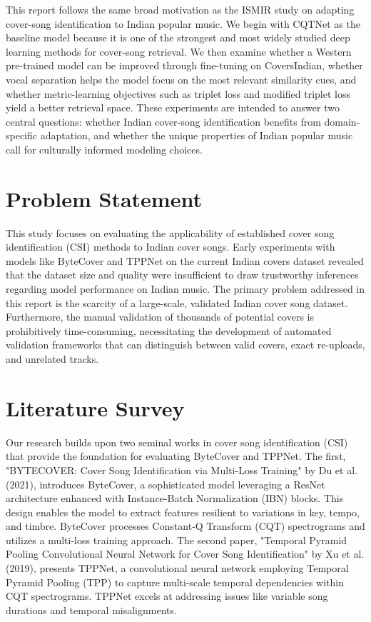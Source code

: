 \documentclass[conference]{IEEEtran}
\begin{document}
This report follows the same broad motivation as the ISMIR study on adapting cover-song identification to Indian popular music. We begin with CQTNet as the baseline model because it is one of the strongest and most widely studied deep learning methods for cover-song retrieval. We then examine whether a Western pre-trained model can be improved through fine-tuning on CoversIndian, whether vocal separation helps the model focus on the most relevant similarity cues, and whether metric-learning objectives such as triplet loss and modified triplet loss yield a better retrieval space. These experiments are intended to answer two central questions: whether Indian cover-song identification benefits from domain-specific adaptation, and whether the unique properties of Indian popular music call for culturally informed modeling choices.

\section{Problem Statement}
This study focuses on evaluating the applicability of established cover song identification (CSI) methods to Indian cover songs. Early experiments with models like ByteCover and TPPNet on the current Indian covers dataset revealed that the dataset size and quality were insufficient to draw trustworthy inferences regarding model performance on Indian music. The primary problem addressed in this report is the scarcity of a large-scale, validated Indian cover song dataset. Furthermore, the manual validation of thousands of potential covers is prohibitively time-consuming, necessitating the development of automated validation frameworks that can distinguish between valid covers, exact re-uploads, and unrelated tracks.

\section{Literature Survey}
Our research builds upon two seminal works in cover song identification (CSI) that provide the foundation for evaluating ByteCover and TPPNet. The first, "BYTECOVER: Cover Song Identification via Multi-Loss Training" by Du et al. (2021), introduces ByteCover, a sophisticated model leveraging a ResNet architecture enhanced with Instance-Batch Normalization (IBN) blocks. This design enables the model to extract features resilient to variations in key, tempo, and timbre. ByteCover processes Constant-Q Transform (CQT) spectrograms and utilizes a multi-loss training approach.
The second paper, "Temporal Pyramid Pooling Convolutional Neural Network for Cover Song Identification" by Xu et al. (2019), presents TPPNet, a convolutional neural network employing Temporal Pyramid Pooling (TPP) to capture multi-scale temporal dependencies within CQT spectrograms. TPPNet excels at addressing issues like variable song durations and temporal misalignments.
\end{document}
